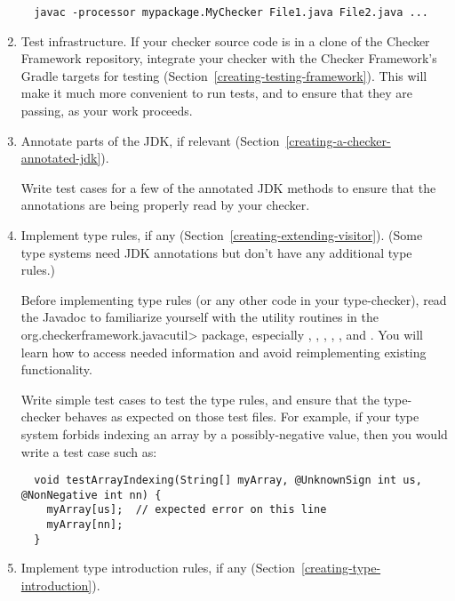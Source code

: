 \begin{enumerate}
\begin{Verbatim}
  javac -processor mypackage.MyChecker File1.java File2.java ...
\end{Verbatim}

\item
\label{creating-tips-test-infrastructure}
  Test infrastructure.
  If your checker source code is in a clone of the Checker Framework
  repository, integrate your checker with the Checker Framework's Gradle
  targets for testing (Section~\ref{creating-testing-framework}).  This
  will make it much more convenient to run tests, and to ensure that they
  are passing, as your work proceeds.

\item
  Annotate parts of the JDK, if relevant
  (Section~\ref{creating-a-checker-annotated-jdk}).

  Write test cases for a few of the annotated JDK methods to ensure
  that the annotations are being properly read by your checker.

\item
  Implement type rules, if any (Section~\ref{creating-extending-visitor}).
  (Some type systems need JDK annotations but don't have any additional
  type rules.)

  Before implementing type rules (or any other code in your type-checker),
  read the Javadoc to familiarize yourself with the utility routines in the
  \<org.checkerframework.javacutil> package, especially
  ,
  ,
  ,
  ,
  , and
  .
  You will learn how to access needed information and avoid
  reimplementing existing functionality.

  Write simple test cases to test the type rules, and ensure that the
  type-checker behaves as expected on those test files.
  For example, if your type system forbids indexing an array by a
  possibly-negative value, then you would write a test case such as:

\begin{Verbatim}
  void testArrayIndexing(String[] myArray, @UnknownSign int us, @NonNegative int nn) {
    myArray[us];  // expected error on this line
    myArray[nn];
  }
\end{Verbatim}

\item
  Implement type introduction rules, if any (Section~\ref{creating-type-introduction}).


\end{enumerate}
